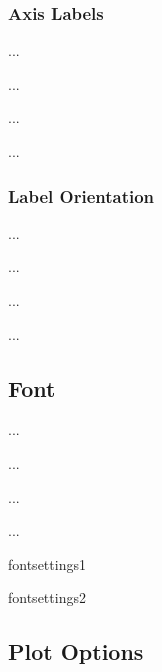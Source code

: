 \newpage

\subsubsection{Axis Labels}
\begin{EnumZB}
\item ...
\item ...
\item ...
\item ...
\end{EnumZB}

\subsubsection{Label Orientation}
\begin{EnumZB}
\item ...
\item ...
\item ...
\item ...
\end{EnumZB}

\subsection{Font}

\begin{EnumZB}
\item ...
\item ...
\item ...
\item ...
\end{EnumZB}

\newpage

\begin{PAWf}[.6]{fontsettings1}
\end{PAWf}

\begin{PAWf}[.6]{fontsettings2}
\end{PAWf}


\subsection{Plot Options}


